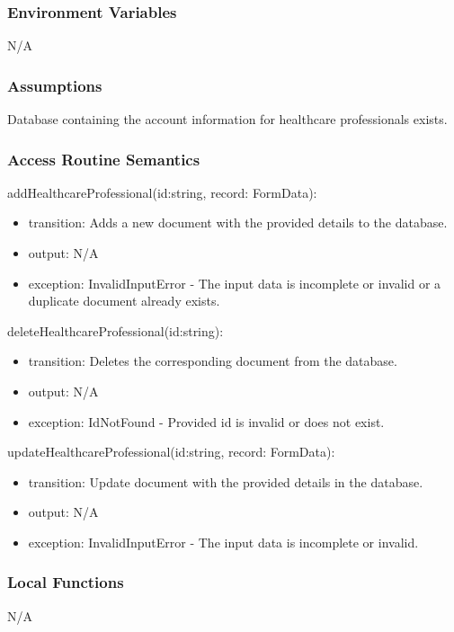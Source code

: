 \documentclass[12pt, titlepage]{article}
\begin{document}
\subsubsection{Environment Variables}
N/A

\subsubsection{Assumptions}
Database containing the account information for healthcare professionals exists.

\subsubsection{Access Routine Semantics}

\noindent addHealthcareProfessional(id:string, record: FormData):
\begin{itemize}
\item transition: Adds a new document with the provided details to the database.
\item output: N/A
\item exception: InvalidInputError - The input data is incomplete or invalid or a duplicate document already exists.
\end{itemize}

\noindent deleteHealthcareProfessional(id:string):
\begin{itemize}
\item transition: Deletes the corresponding document from the database.
\item output: N/A
\item exception: IdNotFound - Provided id is invalid or does not exist.
\end{itemize}

\noindent updateHealthcareProfessional(id:string, record: FormData):
\begin{itemize}
\item transition: Update document with the provided details in the database.
\item output: N/A
\item exception: InvalidInputError - The input data is incomplete or invalid.
\end{itemize}

\subsubsection{Local Functions}

N/A
\end{document}
